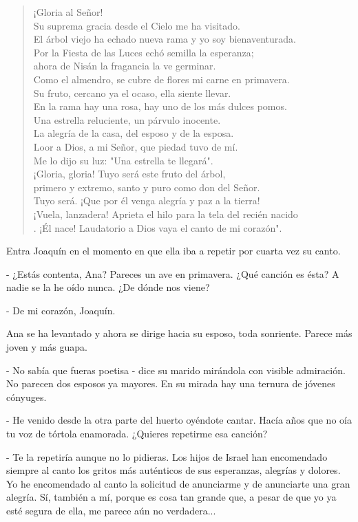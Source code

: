 \documentclass[12pt]{book} %
\begin{document}
\begin{verse}
¡Gloria al Señor! \\
Su suprema gracia desde el Cielo me ha visitado. \\
El árbol viejo ha echado nueva rama y yo soy bienaventurada. \\
Por la Fiesta de las Luces echó semilla la esperanza; \\
ahora de Nisán la fragancia la ve germinar. \\
Como el almendro, se cubre de flores mi carne en primavera. \\
Su fruto, cercano ya el ocaso, ella siente llevar. \\
En la rama hay una rosa, hay uno de los más dulces pomos. \\
Una estrella reluciente, un párvulo inocente. \\
La alegría de la casa, del esposo y de la esposa. \\
Loor a Dios, a mi Señor, que piedad tuvo de mí. \\
Me lo dijo su luz: "Una estrella te llegará". \\
¡Gloria, gloria! Tuyo será este fruto del árbol, \\
primero y extremo, santo y puro como don del Señor. \\
Tuyo será. ¡Que por él venga alegría y paz a la tierra! \\
¡Vuela, lanzadera! Aprieta el hilo para la tela del recién nacido\\. 
¡Él nace! Laudatorio a Dios vaya el canto de mi corazón". 
\end{verse}
Entra Joaquín en el momento en que ella iba a repetir por cuarta vez su canto. 

- ¿Estás contenta, Ana? Pareces un ave en primavera. ¿Qué canción es ésta? A nadie se la he oído nunca. ¿De dónde nos viene? 

- De mi corazón, Joaquín. 

 Ana se ha levantado y ahora se dirige hacia su esposo, toda sonriente. Parece más joven y más guapa. 

- No sabía que fueras poetisa - dice su marido mirándola con visible admiración. No parecen dos esposos ya mayores. En su mirada hay una ternura de jóvenes cónyuges. 

- He venido desde la otra parte del huerto oyéndote cantar. Hacía años que no oía tu voz de tórtola enamorada. ¿Quieres repetirme esa canción? 

- Te la repetiría aunque no lo pidieras. Los hijos de Israel han encomendado siempre al canto los gritos más auténticos de sus esperanzas, alegrías y dolores. Yo he encomendado al canto la solicitud de anunciarme y de anunciarte una gran alegría. Sí, también a mí, porque es cosa tan grande que, a pesar de que yo ya esté segura de ella, me parece aún no verdadera... 
\end{document}
